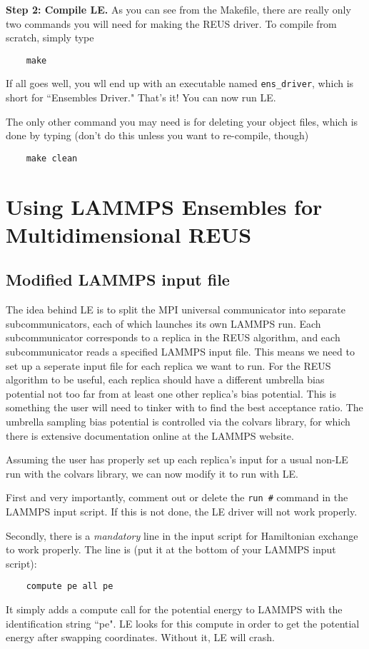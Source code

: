 \documentclass[10pt]{article}
\begin{document}
\textbf{Step 2: Compile LE.} As you can see from the Makefile, there are really
only two commands you will need for making the REUS driver. To compile from scratch, simply type
\begin{verbatim}
	make
\end{verbatim}
If all goes well, you wll end up with an executable named \texttt{ens\_driver}, which is
short for ``Ensembles Driver." That's it! You can now run LE.

The only other command you may need is for deleting your object
files, which is done by typing (don't do this unless you want to re-compile, though)
\begin{verbatim}
	make clean
\end{verbatim}

\section{Using LAMMPS Ensembles for Multidimensional REUS}
\subsection{Modified LAMMPS input file}
The idea behind LE is to split the MPI universal communicator 
into separate subcommunicators,
each of which launches its own LAMMPS run. Each subcommunicator corresponds to a
replica in the REUS algorithm, and each subcommunicator reads a specified LAMMPS input file.
This means we need to set up a seperate input file for each replica we want to run. For the REUS
algorithm to be useful, each replica should have a different umbrella bias potential not
too far from at least one other replica's bias potential. This is something the user will need
to tinker with to find the best acceptance ratio.
The umbrella sampling bias potential is controlled via the colvars library, for which
there is extensive documentation online at the LAMMPS website.

Assuming the user has properly set up each replica's input for a usual non-LE run
with the colvars library, we can now modify it to run with LE. 

First and very importantly, comment out
or delete the \texttt{run \#} command in the LAMMPS input script. If this is not done,
the LE driver will not work properly. 

Secondly, there is a {\em mandatory} line in the input script for Hamiltonian exchange to work properly.
The line is (put it at the bottom of your LAMMPS input script):
\begin{verbatim}
	compute pe all pe
\end{verbatim}
It simply adds a compute call for the potential energy to LAMMPS with the identification string ``pe". LE looks
for this compute in order to get the potential energy after swapping coordinates. Without it, LE will crash.
\end{document}
